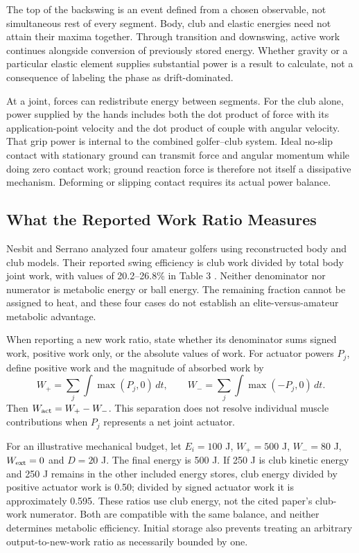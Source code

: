 The top of the backswing is an event defined from a chosen observable, not simultaneous rest of every segment. Body, club and elastic energies need not attain their maxima together. Through transition and downswing, active work continues alongside conversion of previously stored energy. Whether gravity or a particular elastic element supplies substantial power is a result to calculate, not a consequence of labeling the phase as drift-dominated.

At a joint, forces can redistribute energy between segments. For the club alone, power supplied by the hands includes both the dot product of force with its application-point velocity and the dot product of couple with angular velocity. That grip power is internal to the combined golfer--club system. Ideal no-slip contact with stationary ground can transmit force and angular momentum while doing zero contact work; ground reaction force is therefore not itself a dissipative mechanism. Deforming or slipping contact requires its actual power balance.

\subsection*{What the Reported Work Ratio Measures}

Nesbit and Serrano analyzed four amateur golfers using reconstructed body and club models. Their reported swing efficiency is club work divided by total body joint work, with values of 20.2--26.8\% in Table 3 \citep{Nesbit2005b}. Neither denominator nor numerator is metabolic energy or ball energy. The remaining fraction cannot be assigned to heat, and these four cases do not establish an elite-versus-amateur metabolic advantage.

When reporting a new work ratio, state whether its denominator sums signed work, positive work only, or the absolute values of work. For actuator powers $P_j$, define positive work and the magnitude of absorbed work by
\[
W_+=\sum_j\int\max(P_j,0)\,dt,\qquad
W_-=\sum_j\int\max(-P_j,0)\,dt.
\]
Then $W_{\rm act}=W_+-W_-$. This separation does not resolve individual muscle contributions when $P_j$ represents a net joint actuator.

For an illustrative mechanical budget, let $E_i=100$ J, $W_+=500$ J, $W_-=80$ J, $W_{\rm ext}=0$ and $D=20$ J. The final energy is 500 J. If 250 J is club kinetic energy and 250 J remains in the other included energy stores, club energy divided by positive actuator work is 0.50; divided by signed actuator work it is approximately 0.595. These ratios use club energy, not the cited paper's club-work numerator. Both are compatible with the same balance, and neither determines metabolic efficiency. Initial storage also prevents treating an arbitrary output-to-new-work ratio as necessarily bounded by one.

